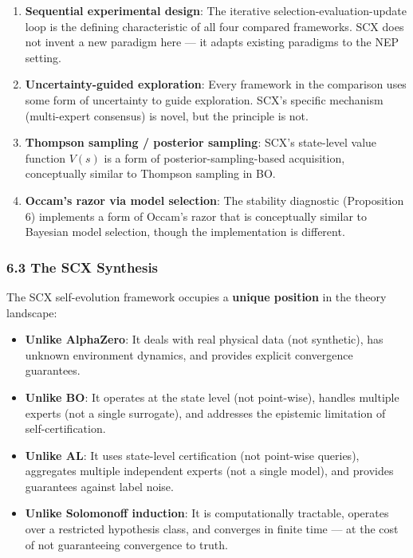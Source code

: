 \documentclass[
  12pt,
]{article}
\providecommand{\tightlist}{%
  \setlength{\itemsep}{0pt}\setlength{\parskip}{0pt}}
\begin{document}
\begin{enumerate}
\def\labelenumi{\arabic{enumi}.}
\item
  \textbf{Sequential experimental design}: The iterative
  selection-evaluation-update loop is the defining characteristic of all
  four compared frameworks. SCX does not invent a new paradigm here ---
  it adapts existing paradigms to the NEP setting.
\item
  \textbf{Uncertainty-guided exploration}: Every framework in the
  comparison uses some form of uncertainty to guide exploration. SCX's
  specific mechanism (multi-expert consensus) is novel, but the
  principle is not.
\item
  \textbf{Thompson sampling / posterior sampling}: SCX's state-level
  value function \(V(s)\) is a form of posterior-sampling-based
  acquisition, conceptually similar to Thompson sampling in BO.
\item
  \textbf{Occam's razor via model selection}: The stability diagnostic
  (Proposition 6) implements a form of Occam's razor that is
  conceptually similar to Bayesian model selection, though the
  implementation is different.
\end{enumerate}

\subsubsection{6.3 The SCX Synthesis}\label{the-scx-synthesis}

The SCX self-evolution framework occupies a \textbf{unique position} in
the theory landscape:

\begin{itemize}
\tightlist
\item
  \textbf{Unlike AlphaZero}: It deals with real physical data (not
  synthetic), has unknown environment dynamics, and provides explicit
  convergence guarantees.
\item
  \textbf{Unlike BO}: It operates at the state level (not point-wise),
  handles multiple experts (not a single surrogate), and addresses the
  epistemic limitation of self-certification.
\item
  \textbf{Unlike AL}: It uses state-level certification (not point-wise
  queries), aggregates multiple independent experts (not a single
  model), and provides guarantees against label noise.
\item
  \textbf{Unlike Solomonoff induction}: It is computationally tractable,
  operates over a restricted hypothesis class, and converges in finite
  time --- at the cost of not guaranteeing convergence to truth.
\end{itemize}
\end{document}
